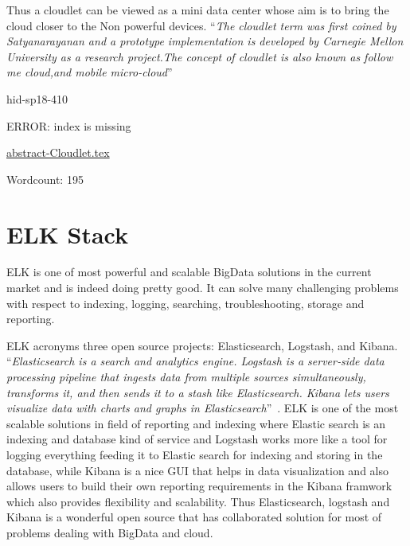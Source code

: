 Thus a cloudlet can be viewed as a mini data center whose aim is to
bring the cloud closer to the Non powerful devices. \color{blue}``\emph{The cloudlet
term was first coined by Satyanarayanan and a prototype implementation
is developed by Carnegie Mellon University as a research project.The
concept of cloudlet is also known as follow me cloud,and mobile
micro-cloud}''\color{black}~\cite{hid-sp18-410-wikiCloudlet}


\begin{IU}

hid-sp18-410

ERROR: index is missing

\href{https://github.com/cloudmesh-community/hid-sp18-410/blob/master//technology/abstract-Cloudlet.tex}{abstract-Cloudlet.tex}

 

Wordcount: 195

\end{IU}

\section{ELK Stack}

ELK is one of most powerful and scalable BigData solutions in the current
market and is indeed doing pretty good. It can solve many challenging 
problems with respect to indexing, logging, searching, troubleshooting,
storage and reporting.

ELK acronyms three open source projects: Elasticsearch, Logstash, 
and Kibana. \color{blue}``\emph{Elasticsearch is a search and analytics engine. Logstash is a 
server‑side data processing pipeline that ingests data from multiple sources 
simultaneously, transforms it, and then sends it to a stash like 
Elasticsearch. Kibana lets users visualize data with charts and graphs in 
Elasticsearch}''\color{black}~\cite{hid-sp18-410-ELKBlog}. ELK is one of the most scalable solutions in
field of reporting and indexing where Elastic search is an indexing and
database kind of service and Logstash works more like a tool for logging
everything feeding it to Elastic search for indexing and storing in 
the database, while Kibana is a nice GUI that helps in data visualization
and also allows users to build their own reporting requirements in the
Kibana framwork which also provides flexibility and scalability.
Thus Elasticsearch, logstash and Kibana is a wonderful open source that
has collaborated solution for most of problems dealing with BigData 
and cloud.



